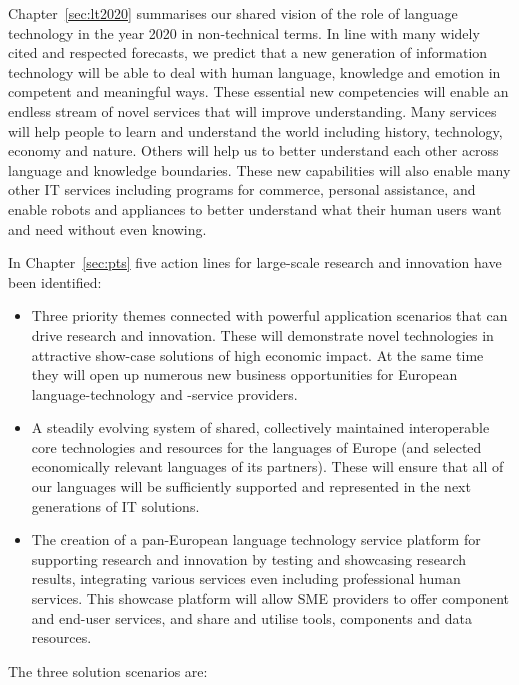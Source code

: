 \documentclass[10pt, plain]{../../metanetpaper}
\begin{document}
\begin{multicols}{2}
Chapter~\ref{sec:lt2020} summarises our shared vision of the role of language technology in the year 2020 in non-technical terms. In line with many widely cited and respected forecasts, we predict that a new generation of information technology will be able to deal with human language, knowledge and emotion in competent and meaningful ways. These essential new competencies will enable an endless stream of novel services that will improve understanding. Many services will help people to learn and understand the world including history, technology, economy and nature. Others will help us to better understand each other across language and knowledge boundaries. These new capabilities will also enable many other IT services including programs for commerce, personal assistance, and enable robots and appliances to better understand what their human users want and need without even knowing. 

In Chapter~\ref{sec:pts} five action lines for large-scale research and innovation have been identified:

\begin{itemize}
\item Three priority themes connected with powerful application scenarios that can drive research and innovation. These will demonstrate novel technologies in attractive show-case solutions of high economic impact. At the same time they will open up numerous new business opportunities for European language-technology and -service providers.
\item A steadily evolving system of shared, collectively maintained interoperable core technologies and resources for the languages of Europe (and selected economically relevant languages of its partners). These will ensure that all of our languages will be sufficiently supported and represented in the next generations of IT solutions.
\item The creation of a pan-European language technology service platform for supporting research and innovation by testing and showcasing research results, integrating various services even including professional human services. This showcase platform will allow SME providers to offer component and end-user services, and share and utilise tools, components and data resources. 
\end{itemize}

The three solution scenarios are:


\end{multicols}
\end{document}
